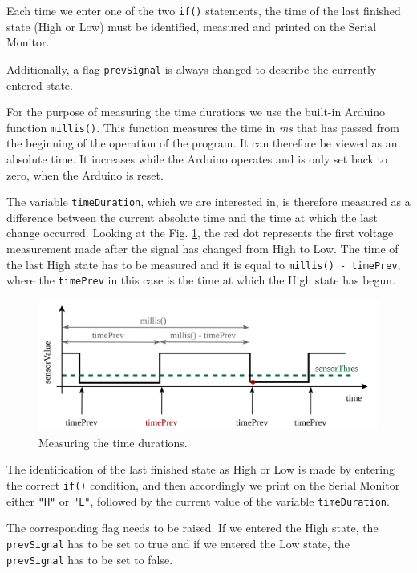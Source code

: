\documentclass[12pt]{report}
\begin{document}
Each time we enter one of the two \verb|if()| statements, the time of the last finished state (High or Low) must be identified, measured and printed on the Serial Monitor.

Additionally, a flag \verb|prevSignal| is always changed to describe the currently entered state.

For the purpose of measuring the time durations we use the built-in Arduino function \verb|millis()|. This function measures the time in \textit{ms} that has passed from the beginning of the operation of the program. It can therefore be viewed as an absolute time. It increases while the Arduino operates and is only set back to zero, when the Arduino is reset.

The variable \verb|timeDuration|, which we are interested in, is therefore measured as a difference between the current absolute time and the time at which the last change occurred. Looking at the Fig. \ref{fig:timedur}, the red dot represents the first voltage measurement made after the signal has changed from High to Low. The time of the last High state has to be measured and it is equal to \verb|millis() - timePrev|, where the 
\textcolor{cadr}{\texttt{timePrev}} in this case is the time at which the High state has begun.

\begin{figure}[H]
\centering\includegraphics[width=14.5cm]{timedurations}
\caption{Measuring the time durations.}				
\label{fig:timedur}
\end{figure}

The identification of the last finished state as High or Low is made by entering the correct \verb|if()| condition, and then accordingly we print on the Serial Monitor either \verb|"H"| or \verb|"L"|, followed by the current value of the variable \verb|timeDuration|.

The corresponding flag needs to be raised. If we entered the High state, the \verb|prevSignal| has to be set to true and if we entered the Low state, the \verb|prevSignal| has to be set to false.
\end{document}
